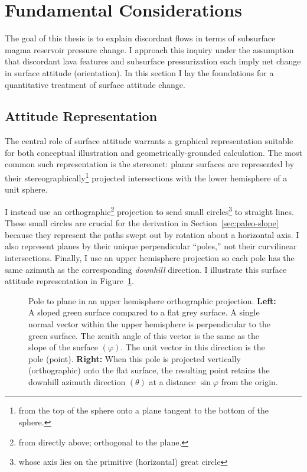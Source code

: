 \section{Fundamental Considerations}\label{sec:considerations}

The goal of this thesis is to explain discordant flows in terms of subsurface magma reservoir pressure change. I approach this inquiry under the assumption that discordant lava features and subsurface pressurization each imply net change in surface attitude (orientation). In this section I lay the foundations for a quantitative treatment of surface attitude change.

\subsection{Attitude Representation}\label{sec:attitude-representation}

The central role of surface attitude warrants a graphical representation suitable for both conceptual illustration and geometrically-grounded calculation. The most common such representation is the stereonet: planar surfaces are represented by their stereographically\footnote{from the top of the sphere onto a plane tangent to the bottom of the sphere.} projected intersections with the lower hemisphere of a unit sphere.

I instead use an orthographic\footnote{from directly above; orthogonal to the plane.} projection to send small circles\footnote{whose axis lies on the primitive (horizontal) great circle} to straight lines. These small circles are crucial for the derivation in Section~\ref{sec:paleo-slope} because they represent the paths swept out by rotation about a horizontal axis. I also represent planes by their unique perpendicular ``poles,'' not their curvilinear intersections. Finally, I use an upper hemisphere projection so each pole has the same azimuth as the corresponding \emph{downhill} direction. I illustrate this surface attitude representation in Figure~\ref{fig:surface}.


\begin{figure}
    \caption[Orthographic pole to plane]{Pole to plane in an upper hemisphere orthographic projection. \textbf{Left:} A sloped green surface compared to a flat grey surface. A single normal vector within the upper hemisphere is perpendicular to the green surface. The zenith angle of this vector is the same as the slope of the surface $(\varphi)$. The unit vector in this direction is the pole (point). \textbf{Right:} When this pole is projected vertically (orthographic) onto the flat surface, the resulting point retains the downhill azimuth direction $(\theta)$ at a distance $\sin\varphi$ from the origin.}%
    \label{fig:surface}%
\end{figure}

